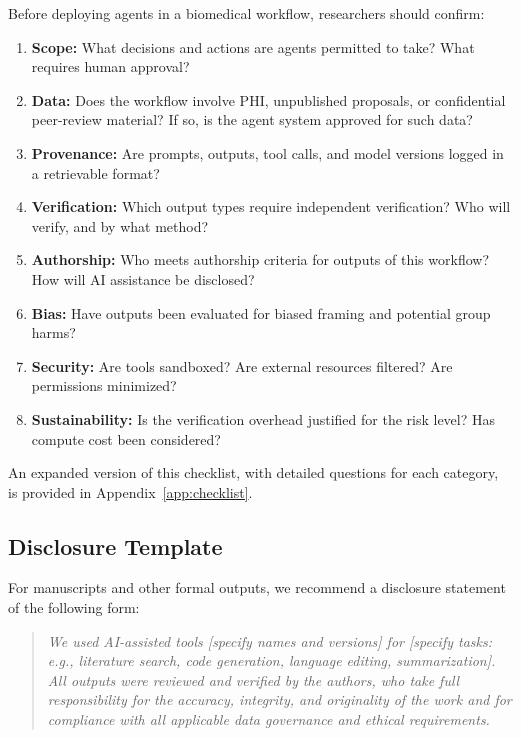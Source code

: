 \documentclass[11pt,letterpaper]{article}
\begin{document}
Before deploying agents in a biomedical workflow, researchers should confirm:

\begin{enumerate}[leftmargin=*]
    \item \textbf{Scope:} What decisions and actions are agents permitted to take? What requires human approval?
    
    \item \textbf{Data:} Does the workflow involve PHI, unpublished proposals, or confidential peer-review material? If so, is the agent system approved for such data?
    
    \item \textbf{Provenance:} Are prompts, outputs, tool calls, and model versions logged in a retrievable format?
    
    \item \textbf{Verification:} Which output types require independent verification? Who will verify, and by what method?
    
    \item \textbf{Authorship:} Who meets authorship criteria for outputs of this workflow? How will AI assistance be disclosed?
    
    \item \textbf{Bias:} Have outputs been evaluated for biased framing and potential group harms?
    
    \item \textbf{Security:} Are tools sandboxed? Are external resources filtered? Are permissions minimized?
    
    \item \textbf{Sustainability:} Is the verification overhead justified for the risk level? Has compute cost been considered?
\end{enumerate}

An expanded version of this checklist, with detailed questions for each category, is provided in Appendix~\ref{app:checklist}.

\subsection{Disclosure Template}

For manuscripts and other formal outputs, we recommend a disclosure statement of the following form:

\begin{quote}
\textit{We used AI-assisted tools [specify names and versions] for [specify tasks: e.g., literature search, code generation, language editing, summarization]. All outputs were reviewed and verified by the authors, who take full responsibility for the accuracy, integrity, and originality of the work and for compliance with all applicable data governance and ethical requirements.}
\end{quote}
\end{document}
